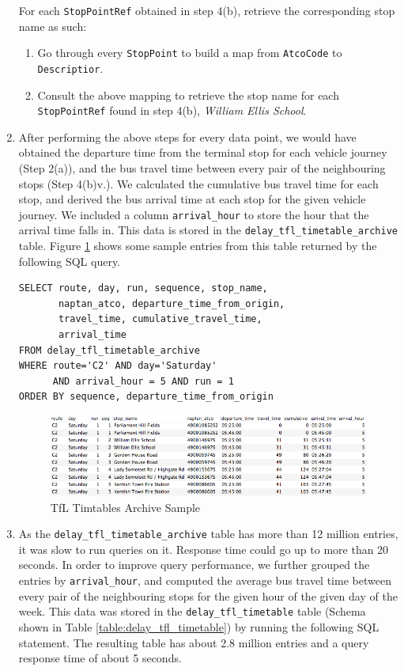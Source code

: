 \begin{enumerate}
    For each \texttt{StopPointRef} obtained in step 4(b), retrieve the corresponding stop name as such:
    \begin{enumerate}
      \item Go through every \texttt{StopPoint} to build a map from \texttt{AtcoCode} to \texttt{Descriptior}.
      \item Consult the above mapping to retrieve the stop name for each \texttt{StopPointRef} found in step 4(b), \textit{William Ellis School}.
    \end{enumerate}

    \item After performing the above steps for every data point, we would have obtained the departure time from the terminal stop for each vehicle journey (Step 2(a)), and the bus travel time between every pair of the neighbouring stops (Step 4(b)v.). We calculated the cumulative bus travel time for each stop, and derived the bus arrival time at each stop for the given vehicle journey. We included a column \texttt{arrival\_hour} to store the hour that the arrival time falls in. This data is stored in the \texttt{delay\_tfl\_timetable\_archive} table. Figure \ref{fig:tfl_timetable_archive_sample} shows some sample entries from this table returned by the following SQL query.

    \begin{verbatim}
SELECT route, day, run, sequence, stop_name,
       naptan_atco, departure_time_from_origin,
       travel_time, cumulative_travel_time,
       arrival_time
FROM delay_tfl_timetable_archive
WHERE route='C2' AND day='Saturday'
      AND arrival_hour = 5 AND run = 1
ORDER BY sequence, departure_time_from_origin
    \end{verbatim}

\begin{figure}
\centering
\includegraphics[width=\textwidth]{figures/tfl_timetable_archive_sample.png}
\caption{\label{fig:tfl_timetable_archive_sample} TfL Timtables Archive Sample}
\end{figure}

    \item As the \texttt{delay\_tfl\_timetable\_archive} table has more than 12 million entries, it was slow to run queries on it. Response time could go up to more than 20 seconds. In order to improve query performance, we further grouped the entries by \texttt{arrival\_hour}, and computed the average bus travel time between every pair of the neighbouring stops for the given hour of the given day of the week. This data was stored in the \texttt{delay\_tfl\_timetable} table (Schema shown in Table \ref{table:delay_tfl_timetable}) by running the following SQL statement. The resulting table has about 2.8 million entries and a query response time of about 5 seconds.


\end{enumerate}
